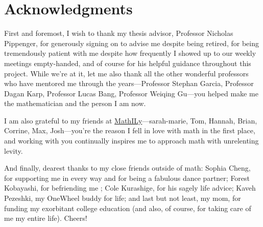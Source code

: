 \documentclass{final-report}
\begin{document}
%
%

\pagestyle{plain}
\newpage
\tableofcontents

\chapter*{Acknowledgments}

First and foremost, I wish to thank my thesis advisor, Professor Nicholas
Pippenger, for generously signing on to advise me despite being retired, for
being tremendously patient with me despite how frequently I showed up to our
weekly meetings empty-handed, and of course for his helpful guidance throughout
this project.  While we're at it, let me also thank all the other wonderful
professors who have mentored me through the years—Professor Stephan Garcia,
Professor Dagan Karp, Professor Lucas Bang, Professor Weiqing Gu—you helped make
me the mathematician and the person I am now.

I am also grateful to my friends at
\href{http://mathily.org}{MathILy}—sarah-marie, Tom, Hannah, Brian, Corrine,
Max, Josh—you're the reason I fell in love with math in the first place, and
working with you continually inspires me to approach math with unrelenting
levity.


And finally, dearest thanks to my close friends outside of math: Sophia Cheng,
for supporting me in every way and for being a fabulous dance partner; Forest
Kobayashi, for befriending me ; Cole Kurashige, for his
sagely life advice; Kaveh Pezeshki, my OneWheel buddy for life; and last but not
least, my mom, for funding my exorbitant college education (and also, of course,
for taking care of me my entire life).  Cheers!

\cleardoublepage
{}

\pagestyle{thesis}
\end{document}
